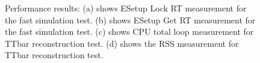 \documentclass[12pt]{iopart}
\begin{document}
\begin{figure}[h]
\begin{minipage}{.48\textwidth}
\end{minipage}
\begin{minipage}{.48\textwidth}
\end{minipage}\hfill
\begin{minipage}{.48\textwidth}
 \end{minipage}
 \caption{Performance results: (a) shows ESetup Lock RT measurement for the fast simulation test. (b) shows ESetup Get RT measurement for the fast simulation test. (c) shows CPU total loop measurement for TTbar reconstruction test. (d) shows the RSS measurement for TTbar reconstruction test.}
\label{fig:performance1}
\end{figure}
\end{document}
